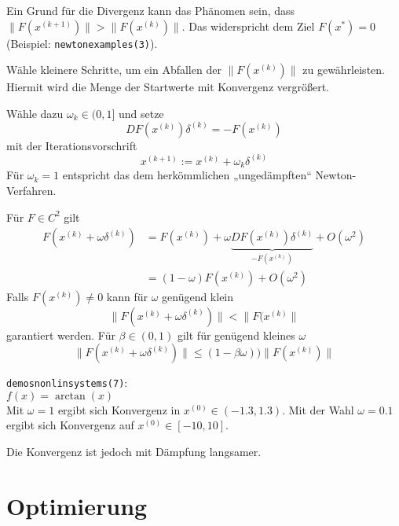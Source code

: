 \documentclass[
]{mycourse}
\begin{document}
Ein Grund für die Divergenz kann das Phänomen sein, dass $\|F(x^{(k+1)})\| > \|F(x^{(k)})\|$.
Das widerspricht dem Ziel $F(x^*) = 0$ (Beispiel: \texttt{newton\textunderscore examples(3)}).

\begin{seg}
	Wähle kleinere Schritte, um ein Abfallen der $\|F(x^{(k)})\|$ zu gewährleisten. 
	Hiermit wird die Menge der Startwerte mit Konvergenz vergrößert.

	Wähle dazu $\omega_k \in (0,1]$ und setze
	\[
		DF(x^{(k)}) \delta^{(k)} = - F(x^{(k)})
	\]
	mit der Iterationsvorschrift
	\[
		x^{(k+1)} := x^{(k)} + \omega_k \delta^{(k)}
	\]
	Für $\omega_k = 1$ entspricht das dem herkömmlichen „ungedämpften“ Newton-Verfahren.

	Für $F \in C^2$ gilt
	\begin{align*}
		F(x^{(k)} + \omega \delta^{(k)}) &= F(x^{(k)}) + \omega \underbrace{DF(x^{(k)})\delta^{(k)}}_{-F(x^{(k)})} + O(\omega^2) \\
		&= (1 - \omega)F(x^{(k)}) + O(\omega^2)
	\end{align*}
	Falls $F(x^{(k)}) \neq 0$ kann für $\omega$ genügend klein 
	\[
		\|F(x^{(k)} + \omega \delta^{(k)}) \| < \|F(x^{(k)}\|
	\]
	garantiert werden.
	Für $\beta \in (0,1)$ gilt für genügend kleines $\omega$
	\[
		\|F(x^{(k)} + \omega \delta^{(k)})\|  \le (1 - \beta\omega)) \|F(x^{(k)})\|
	\]
	\begin{ex*}
		\texttt{demos\textunderscore nonlin\textunderscore systems(7)}: \\
		$f(x) = \arctan(x)$  \\
		Mit $\omega = 1$ ergibt sich Konvergenz in $x^{(0)} \in (-1.3, 1.3)$.
		Mit der Wahl $\omega = 0.1$ ergibt sich Konvergenz auf $x^{(0)} \in [-10, 10]$.

		Die Konvergenz ist jedoch mit Dämpfung langsamer.
	\end{ex*}
\end{seg}



\chapter{Optimierung}
\end{document}
